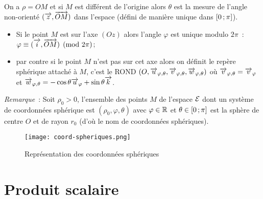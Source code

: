 On a \(\rho=OM\) et si \(M\) est différent de l'origine alors \(\theta\) est la mesure de l'angle non-orienté \((\overrightarrow{z},\overrightarrow{OM})\) dans l'espace (défini de manière unique dans \(\left[ 0 \, ;  \pi \right]\)).
\begin{itemize}
\item Si le point \(M\) est sur l'axe \((Oz)\) alors l'angle \(\varphi\) est unique modulo \(2\pi\)~: \(\varphi \equiv (\overrightarrow{i},\overrightarrow{OM}) \pmod {2\pi}\);
\item par contre si le point \(M\) n'est pas sur cet axe alors on définit le repère sphérique attaché à \(M\), c'est le ROND \((O,\overrightarrow{u}_{\varphi,\theta},\overrightarrow{v}_{\varphi,\theta},\overrightarrow{w}_{\varphi,\theta})\) où \(\overrightarrow{v}_{\varphi,\theta}=\overrightarrow{v}_{\varphi}\) et \(\overrightarrow{w}_{\varphi,\theta}=-\cos\theta\overrightarrow{u}_\varphi+\sin\theta\overrightarrow{k}\).
\end{itemize}

\emph{Remarque}~: Soit \(\rho_0>0\), l'ensemble des points \(M\) de l'espace \(\mathcal{E}\) dont un système de coordonnées sphérique est \((\rho_0,\varphi,\theta)\) avec \(\varphi\in\mathbb{R}\) et \(\theta\in \left[ 0 \, ;  \pi \right]\) est la sphère de centre \(O\) et de rayon \(r_0\) (d'où le nom de coordonnées sphériques).

\begin{figure}
    \centering
    \texttt{[image: coord-spheriques.png]}
    \caption{Représentation des coordonnées sphériques}
    \label{fig:repsphere}
\end{figure}


\section{Produit scalaire}
